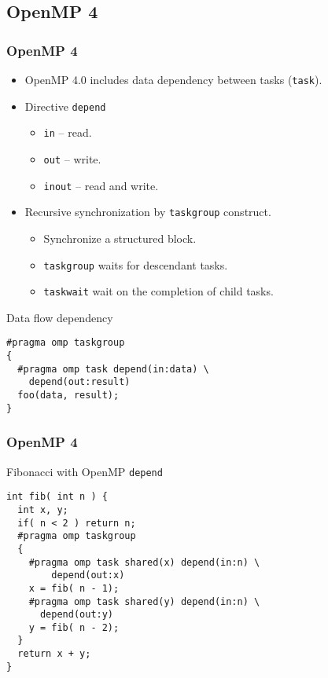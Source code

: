 \subsection{OpenMP 4}
\begin{frame}[fragile]
  \frametitle{OpenMP 4}
  \begin{itemize}
  \item OpenMP 4.0 includes data dependency between tasks (\texttt{task}).
  \pause
  \item Directive \texttt{depend}
    \begin{itemize}
    \item \texttt{in} -- read.
    \item \texttt{out} -- write.
    \item \texttt{inout} -- read and write.
    \end{itemize}
  \pause
  \item Recursive synchronization by \texttt{taskgroup} construct.
    \begin{itemize}
    \item Synchronize a structured block.
    \item \texttt{taskgroup} waits for \alert{descendant tasks}.
    \item \texttt{taskwait} \alert{wait on the completion of child tasks}.
    \end{itemize}
  \end{itemize}
%
\pause
%
\begin{block}{Data flow dependency}
\begin{lstlisting}
#pragma omp taskgroup
{
  #pragma omp task depend(in:data) \
    depend(out:result)
  foo(data, result);
}
\end{lstlisting}
\end{block}
%
\end{frame}
\begin{frame}[fragile]
  \frametitle{OpenMP 4}
\begin{block}{Fibonacci with OpenMP \texttt{depend}}
\begin{lstlisting}
int fib( int n ) {
  int x, y;
  if( n < 2 ) return n;
  #pragma omp taskgroup
  {
    #pragma omp task shared(x) depend(in:n) \
        depend(out:x)
    x = fib( n - 1);
    #pragma omp task shared(y) depend(in:n) \
      depend(out:y)
    y = fib( n - 2);
  }
  return x + y;
}
\end{lstlisting}
\end{block}
\end{frame}
